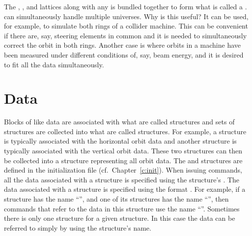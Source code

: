 The , , and  lattices along with any
 is bundled together to form what is called a
. \tao can simultaneously handle multiple universes. Why
is this useful? It can be used, for example, to simulate both rings of
a collider machine. This can be convenient if there are, say, steering
elements in common and it is needed to simultaneously correct the
orbit in both rings. Another case is where orbits in a machine have
been measured under different conditions of, say, beam energy, and it
is desired to fit all the data simultaneously.

\section{Data}

Blocks of like data are associated with what are called  structures
and sets of  structures are collected into what are called
 structures. For example, a  structure is typically
associated with the horizontal orbit data and another  structure is
typically associated with the vertical orbit data. These two structures can then
be collected into a  structure representing all orbit data. The
 and  structures are defined in the \tao initialization
file (cf.~Chapter~\ref{c:init}).  When issuing \tao commands, all the data
associated with a  structure is specified using the 
structure's .  The data associated with a  structure is
specified using the format . For example, if a 
structure has the name ``'', and one of its  structures
has the name ``'', then \tao commands that refer to the data in this
 structure use the name ``''. Sometimes there is only
one  structure for a given  structure. In this case the
data can be referred to simply by using the  structure's name.

